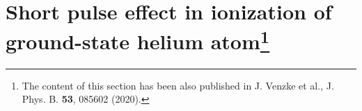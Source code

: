\section[Short pulse effect in ionization of ground-state helium atom]{Short pulse effect in ionization of ground-state helium atom\protect\footnote{The content of this section has been also published in J. Venzke et al., J. Phys. B. \textbf{53}, 085602 (2020).}} %
\label{sec:short_pulse_effect}


